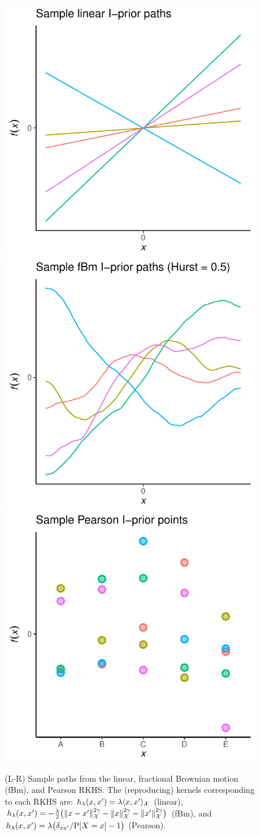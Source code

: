 \documentclass{beamer}
\newlength{\onecolwid}
\newlength{\twocolwid}
\newlength{\threecolwid}
\begin{document}
\begin{frame}[t]
\begin{columns}[t]
\begin{column}{\threecolwid}
\begin{columns}[t,totalwidth=\twocolwid]
\begin{column}{\twocolwid}
\vspace{-0.5cm}
\begin{figure}
\includegraphics[width=0.33\linewidth]{figure/kernel_path_canonical}
\includegraphics[width=0.33\linewidth]{figure/kernel_path_fbm}
\includegraphics[width=0.33\linewidth]{figure/kernel_path_pearson}
\vspace{-1.6cm}
\caption{(L-R) Sample paths from the linear, fractional Brownian motion (fBm), and Pearson RKHS. The (reproducing) kernels corresponding to each RKHS are: $h_\lambda(x,x') = \lambda  \langle x,x' \rangle_{\mathcal X}$ (linear), $h_\lambda(x,x') = -\frac{\lambda}{2} \big( \lVert x-x'\rVert_{\mathcal X}^{2\gamma} - \lVert x\rVert_{\mathcal X}^{2\gamma} - \lVert x'\rVert_{\mathcal X}^{2\gamma}\big)$ (fBm), and $h_\lambda(x,x') = \lambda \big( {\delta_{xx'}} / {\operatorname{P}[X=x]} - 1 \big)$ (Pearson).}
\end{figure}

\begin{columns}[t,totalwidth=\twocolwid]  %
\begin{column}{\onecolwid}  %


\end{column}
\end{columns}
\end{column}
\end{columns}
\end{column}
\end{columns}
\end{frame}
\end{document}

